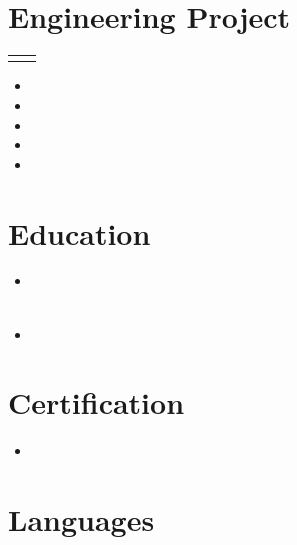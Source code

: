 \documentclass[a4paper,10pt]{article}
\makeatletter
\newcommand{\resumeProject}[2]{
    \begin{tabularx}{\textwidth}{@{}X r@{}}
        \textbf{#1} & \textit{#2}
    \end{tabularx}
    \vspace{1pt}
}
\makeatother
\begin{document}
\section*{Engineering Project}

\resumeProject{}{}

\begin{itemize}

\item

\item

\item

\item

\item

\end{itemize}

\section*{Education}

\begin{itemize}

\item
\textbf{}
\hfill \textit{}\\
\textit{}\\
 

\vspace{3pt}

\item
\textbf{}
\hfill \textit{}\\
\textit{}

\end{itemize}

\section*{Certification}

\begin{itemize}

\item
\textbf{}
\hfill \textit{}\\
 

\end{itemize}

\section*{Languages}
\end{document}
